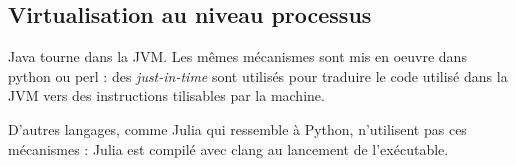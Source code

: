 \documentclass[11pt]{article}
\begin{document}
\subsection{Virtualisation au niveau processus}

Java tourne dans la JVM. Les mêmes mécanismes sont mis en oeuvre dans python ou perl : des \textit{just-in-time} sont utilisés pour traduire le code utilisé dans la JVM vers des instructions tilisables par la machine.

D'autres langages, comme Julia qui ressemble à Python, n'utilisent pas ces mécanismes : Julia est compilé avec clang au lancement de l'exécutable.
\end{document}

